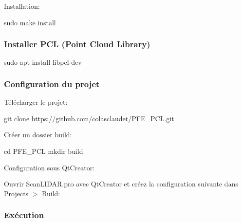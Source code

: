 \begin{DoxyEnumerate}
\item Installation\+:
\end{DoxyEnumerate}


\begin{DoxyCode}
sudo make install
\end{DoxyCode}


\subsubsection*{Installer P\+CL (Point Cloud Library)}


\begin{DoxyCode}
sudo apt install libpcl-dev
\end{DoxyCode}


\subsubsection*{Configuration du projet}


\begin{DoxyEnumerate}
\item Télécharger le projet\+:
\end{DoxyEnumerate}


\begin{DoxyCode}
git clone https://github.com/colasclaudet/PFE\_PCL.git
\end{DoxyCode}



\begin{DoxyEnumerate}
\item Créer un dossier build\+:
\end{DoxyEnumerate}


\begin{DoxyCode}
cd PFE\_PCL
mkdir build
\end{DoxyCode}



\begin{DoxyEnumerate}
\item Configuration sous Qt\+Creator\+:
\end{DoxyEnumerate}

Ouvrir {\ttfamily Scan\+L\+I\+D\+A\+R.\+pro} avec Qt\+Creator et créez la configuration suivante dans Projects $>$ Build\+:



\subsubsection*{Exécution}

